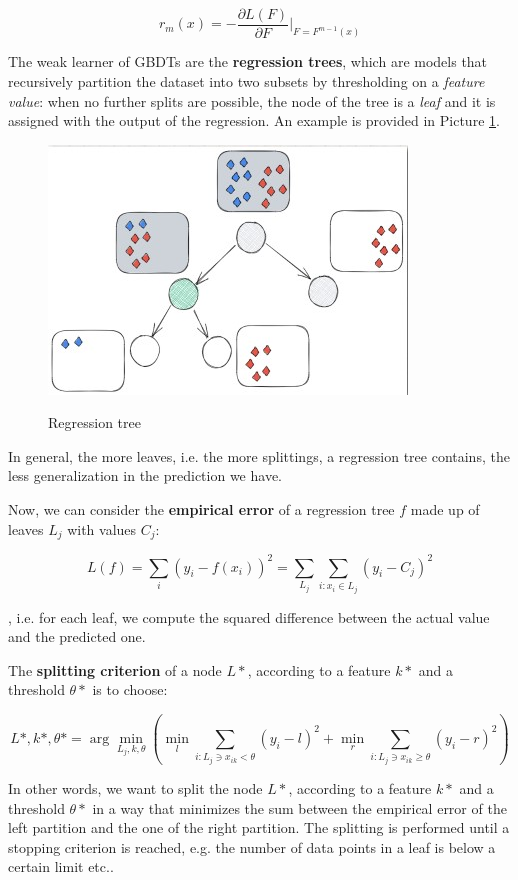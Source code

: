 $$
r_m(x) = - \frac{\partial L(F)}{\partial F}|_{F = F^{m-1}(x)}
$$

The weak learner of GBDTs are the \textbf{regression trees}, which are models that recursively partition the dataset into two subsets by thresholding on a \textit{feature value}: when no further splits are possible, the node of the tree is a \textit{leaf} and it is assigned with the output of the regression. An example is provided in Picture \ref{reg trees}.

\begin{figure}[h!]
		\centering
		\includegraphics[scale = 1.5]{img/regression trees.jpg}
        \label{reg trees}
        \caption{Regression tree}
\end{figure}

In general, the more leaves, i.e. the more splittings, a regression tree contains, the less generalization in the prediction we have.

Now, we can consider the \textbf{empirical error} of a regression tree $f$ made up of leaves $L_j$ with values $C_j$:

$$
L(f) = \sum_i (y_i - f(x_i))^2 = \sum_{L_j} \sum_{i : x_i \in L_j} (y_i - C_j)^2
$$

, i.e. for each leaf, we compute the squared difference between the actual value and the predicted one.

The \textbf{splitting criterion} of a node $L*$, according to a feature $k*$ and a threshold $\theta*$ is to choose:

$$
L*, k*, \theta* = \arg\min_{L_j, k, \theta} (\min_l \sum_{i : L_j \ni x_{ik} < \theta} (y_i - l)^2 + \min_r \sum_{i : L_j \ni x_{ik} \geq \theta} (y_i - r)^2)
$$

In other words, we want to split the node $L*$, according to a feature $k*$ and a threshold $\theta*$ in a way that minimizes the sum between the empirical error of the left partition and the one of the right partition. The splitting is performed until a stopping criterion is reached, e.g. the number of data points in a leaf is below a certain limit etc..

